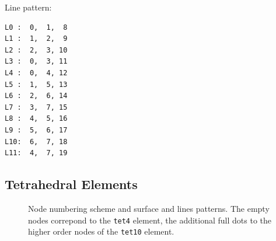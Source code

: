Line pattern:
\begin{verbatim}
L0 :  0,  1,  8
L1 :  1,  2,  9
L2 :  2,  3, 10
L3 :  0,  3, 11
L4 :  0,  4, 12
L5 :  1,  5, 13
L6 :  2,  6, 14
L7 :  3,  7, 15
L8 :  4,  5, 16
L9 :  5,  6, 17
L10:  6,  7, 18
L11:  4,  7, 19
\end{verbatim}

\newpage
\subsection{Tetrahedral Elements}

\begin{figure}[h!]
\begin{center}
\caption{Node numbering scheme and surface and lines patterns. The empty nodes correpond to the \texttt{tet4} element, the additional full dots to the higher order nodes of the \texttt{tet10} element.}
\label{fig:conventions:tet}
\end{center}
\end{figure}

